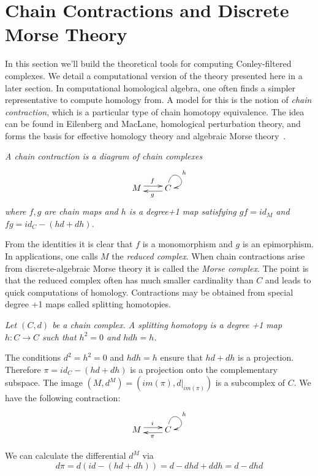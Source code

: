 

\section{Chain Contractions and Discrete Morse Theory}\label{sec:contractions}

In this section we'll build the theoretical tools for computing Conley-filtered complexes.   We detail a computational version of the theory presented here in a later section.    In computational homological algebra, one often finds a simpler representative to compute homology from.  A model for this is the notion of {\em chain contraction}, which is a particular type of chain homotopy equivalence.  The idea can be found in Eilenberg and MacLane, homological perturbation theory, and forms the basis for effective homology theory and algebraic Morse theory~\cite{}.

\begin{defn}
{\em A {\em chain contraction} is a diagram of chain complexes
\[
\xymatrixrowsep{0.03in}
\xymatrixcolsep{0.3in}
\xymatrix{
M  \ar[r]<3pt>^{f} & \ar[l]<3pt>^{g} C \ar@(u,r)^{h}
}
\]
where $f,g$ are chain maps and $h$ is a degree+1 map satisfying $gf = id_M$ and $fg = id_C-(hd+dh)$.
}
\end{defn}

From the identities it is clear that $f$ is a monomorphism and $g$ is an epimorphism.  In applications, one calls $M$ the {\em reduced complex}.  When chain contractions arise from discrete-algebraic Morse theory it is called the {\em Morse complex}.  The point is that the reduced complex often has much smaller cardinality than $C$ and leads to quick computations of homology.  Contractions may be obtained from special degree +1 maps called splitting homotopies.

\begin{defn}
{\em
Let $(C,d)$ be a chain complex.  A {\em splitting homotopy} is a degree +1 map $h:C\to C$ such that $h^2=0$ and $h dh = h$.
}
\end{defn}

The conditions $d^2=h^2=0$ and $hdh = h$ ensure that $hd+dh$ is a projection.  Therefore $\pi=id_C-(hd+dh)$ is a projection onto the complementary subspace.  The image $(M,d^M)=(im(\pi),d|_{im(\pi)})$ is a subcomplex of $C$.  We have the following contraction:
\[
\xymatrixrowsep{0.03in}
\xymatrixcolsep{0.3in}
\xymatrix{
M  \ar[r]<3pt>^{i} & \ar[l]<3pt>^{\pi} C \ar@(u,r)^{h}
}
\]

We can calculate the differential $d^M$ via $$d\pi = d(id-(hd+dh)) = d-dhd + ddh = d-dhd$$


